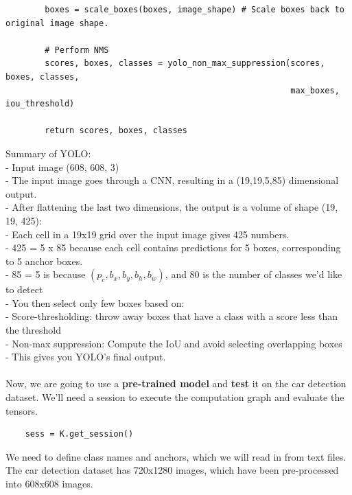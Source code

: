 \documentclass[11pt, a4paper]{article}
\begin{document}
\begin{spacing}{1.1}
\begin{lstlisting}
		boxes = scale_boxes(boxes, image_shape) # Scale boxes back to original image shape.
		
		# Perform NMS
		scores, boxes, classes = yolo_non_max_suppression(scores, boxes, classes, 
		                                                  max_boxes, iou_threshold)
		
		return scores, boxes, classes \end{lstlisting} \newpage

	\noindent Summary of YOLO: \\
	- Input image (608, 608, 3) \\
	- The input image goes through a CNN, resulting in a (19,19,5,85) dimensional output. \\
	- After flattening the last two dimensions, the output is a volume of shape (19, 19, 425): \\
	\hspace*{2mm} - Each cell in a 19x19 grid over the input image gives 425 numbers.  \\
	\hspace*{2mm} - 425 = 5 x 85 because each cell contains predictions for 5 boxes, corresponding to 5 anchor boxes.  \\
	\hspace*{2mm} - 85 = 5 is because $(p_c, b_x, b_y, b_h, b_w)$, and 80 is the number of classes we'd like to detect \\
	- You then select only few boxes based on: \\
	\hspace*{2mm} - Score-thresholding: throw away boxes that have a class with a score less than the threshold \\
	\hspace*{2mm} - Non-max suppression: Compute the IoU and avoid selecting overlapping boxes \\
	- This gives you YOLO's final output.  \\~\\
	Now, we are going to use a \textbf{pre-trained model} and \textbf{test} it on the car detection dataset. We'll need a session to execute the computation graph and evaluate the tensors.
	\begin{lstlisting}
	sess = K.get_session()	\end{lstlisting} \vspace*{1mm}
	We need to define class names and anchors, which we will read in from text files. The car detection dataset has 720x1280 images, which have been pre-processed into 608x608 images.

\end{spacing}
\end{document}
